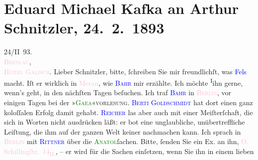 

               \section[Eduard Michael Kafka an Arthur Schnitzler, 24. 2. 1893]{ Eduard Michael Kafka an Arthur Schnitzler, 24. 2. 1893}\nopagebreak{}\rehead{ }\normalsize\beginnumbering{} \toendnotes[C]{\smallbreak\pagebreak[2]} 
\toendnotes[C]{\smallbreak}\pstart
           \raggedleft{}{\pb}24/II 93.{\\}\textcolor{pink}{\textsc{Breslau}}{}\ledrightnote{\textcolor{pink}{Breslau}},{\\}\textcolor{pink}{\textsc{Hotel Galisch}}{}\ledrightnote{\textcolor{pink}{Hotel Galisch}}.\pend
           \pstart{}Lieber Schnitzler,\pend\pstart
           bitte, ſchreiben Sie mir freundlichſt, was \textcolor{blue}{Fels}{}\ledrightnote{\textcolor{blue}{Friedrich Michael Fels}}
               macht. Iſt er wirklich in \textcolor{pink}{Meran}{}\ledrightnote{\textcolor{pink}{Meran}}, wie \textcolor{blue}{\textsc{Bahr}}{}\ledrightnote{\textcolor{blue}{Hermann Bahr}} mir erzählte. Ich möchte \substVorne{}\textsuperscript{I}\substDazwischen{}i\substHinten{}hn gerne, wenn’s geht, in den nächſten Tagen beſuchen.\pend
           \pstart
           Ich traf \textcolor{blue}{\textsc{Bahr}}{}\ledrightnote{\textcolor{blue}{Hermann Bahr}} in \textcolor{pink}{\textsc{Berlin}}{}\ledrightnote{\textcolor{pink}{Berlin}}, vor einigen Tagen bei der \textsc{»\textcolor{green}{Gaea}{}\ledrightnote{\textcolor{green}{Gaea}}«vorlesung}. \textsc{\textcolor{blue}{Berti Goldschmidt}{}\ledrightnote{\textcolor{blue}{Adalbert von Goldschmidt}}} hat dort einen ganz koloſſalen Erfolg damit gehabt. \textcolor{blue}{\textsc{Reicher}}{}\ledrightnote{\textcolor{blue}{Emanuel Reicher}} las aber auch mit einer Meiſterſchaft, die sich in Worten nicht aus{\pb}drücken läßt: er bot eine unglaubliche,
               unübertreffliche Leiſtung, die ihm auf der ganzen Welt keiner nachmachen kann.\pend
           \pstart
           Ich sprach in \textcolor{pink}{\textsc{Berlin}}{}\ledrightnote{\textcolor{pink}{Berlin}} mit \textcolor{blue}{\textsc{Rittner}}{}\ledrightnote{\textcolor{blue}{Rudolf Rittner}} über die \textsc{\textcolor{green}{Anatol}{}\ledrightnote{\textcolor{green}{Anatol}}}ſachen. Bitte, ſenden Sie ein Ex. an ihn, \textcolor{pink}{O.
                     Schillingſtr. 14\textsubscript{II.}}{}\ledrightnote{\textcolor{pink}{Schillingstraße}}, – er wird \label{T_L00182_1v}\label{T_L00182_1h} für die Sachen einſetzen, wenn Sie ihn in einem lieben
